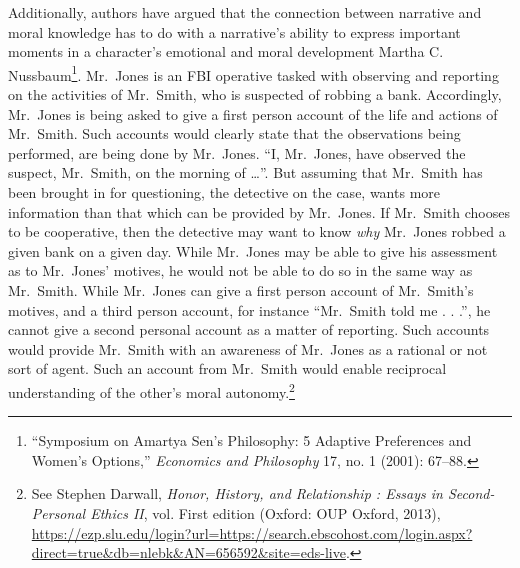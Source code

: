 \documentclass[
  12pt,
]{book}
\theoremstyle{definition}
\theoremstyle{definition}
\theoremstyle{definition}
\theoremstyle{definition}
\theoremstyle{remark}
\begin{document}
Additionally, authors have argued that the connection between narrative and moral knowledge has to do with a narrative's ability to express important moments in a character's emotional and moral development Martha C. Nussbaum\footnote{{``Symposium on {Amartya Sen}'s Philosophy: 5 Adaptive Preferences and Women's Options,''} \emph{Economics and Philosophy} 17, no. 1 (2001): 67--88.}. Mr.~Jones is an FBI operative tasked with observing and reporting on the activities of Mr.~Smith, who is suspected of robbing a bank. Accordingly, Mr.~Jones is being asked to give a first person account of the life and actions of Mr.~Smith. Such accounts would clearly state that the observations being performed, are being done by Mr.~Jones. ``I, Mr.~Jones, have observed the suspect, Mr.~Smith, on the morning of \ldots{}''. But assuming that Mr.~Smith has been brought in for questioning, the detective on the case, wants more information than that which can be provided by Mr.~Jones. If Mr.~Smith chooses to be cooperative, then the detective may want to know \emph{why} Mr.~Jones robbed a given bank on a given day. While Mr.~Jones may be able to give his assessment as to Mr.~Jones' motives, he would not be able to do so in the same way as Mr.~Smith. While Mr.~Jones can give a first person account of Mr.~Smith's motives, and a third person account, for instance ``Mr.~Smith told me . . .'', he cannot give a second personal account as a matter of reporting. Such accounts would provide Mr.~Smith with an awareness of Mr.~Jones as a rational or not sort of agent. Such an account from Mr.~Smith would enable reciprocal understanding of the other's moral autonomy.\footnote{See Stephen Darwall, \emph{Honor, {History}, and {Relationship} : {Essays} in {Second-Personal Ethics II}}, vol. First edition (Oxford: OUP Oxford, 2013), \url{https://ezp.slu.edu/login?url=https://search.ebscohost.com/login.aspx?direct=true&db=nlebk&AN=656592&site=eds-live}.}
\end{document}

